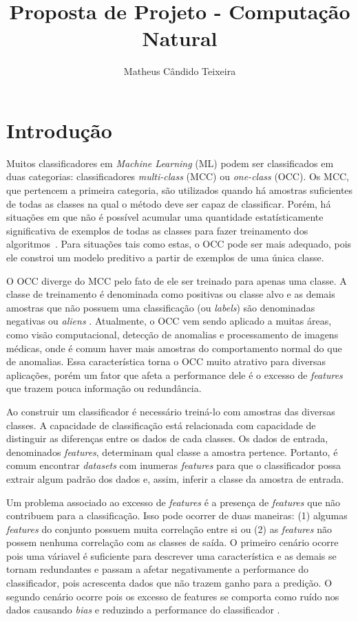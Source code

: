 \documentclass{article}
\begin{document}
\title{Proposta de Projeto - Computação Natural}
\author{Matheus Cândido Teixeira}
\maketitle

\section{Introdução}
Muitos classificadores em {\itshape Machine Learning} (ML) podem ser
classificados em duas categorias: classificadores \textit{multi-class} (MCC) ou
\textit{one-class} (OCC). Os MCC, que pertencem a primeira categoria, são
utilizados quando há amostras suficientes de todas as classes na qual o método
deve ser capaz de classificar. Porém, há situações em que não é possível
acumular uma quantidade estatísticamente significativa de exemplos de todas as
classes para fazer treinamento dos algoritmos~\cite{Khalifa2016, Khan2014}. Para
situações tais como estas, o OCC pode ser mais adequado, pois ele constroi um
modelo preditivo a partir de exemplos de uma única classe.

O OCC diverge do MCC pelo fato de ele ser treinado para apenas uma classe.  A
classe de treinamento é denominada como positivas ou classe alvo e as demais
amostras que não possuem uma classificação (ou \textit{labels}) são denominadas
negativas ou \textit{aliens} \cite{Khan2014, Perera2019}. Atualmente, o OCC vem
sendo aplicado a muitas áreas, como visão computacional, detecção de anomalias e
processamento de imagens médicas, onde é comum haver mais amostras do
comportamento normal do que de anomalias. Essa característica torna o OCC muito
atrativo para diversas aplicações, porém um fator que afeta a performance dele é
o excesso de \textit{features} que trazem pouca informação ou redundância.

Ao construir um classificador é necessário treiná-lo com amostras das diversas
classes. A capacidade de classificação está relacionada com capacidade de
distinguir as diferenças entre os dados de cada classes. Os dados de entrada,
denominados \textit{features}, determinam qual classe a amostra
pertence. Portanto, é comum encontrar \textit{datasets} com inumeras
\textit{features} para que o classificador possa extrair algum padrão dos dados
e, assim, inferir a classe da amostra de entrada.

Um problema associado ao excesso de \textit{features} é a presença de
\textit{features} que não contribuem para a classificação. Isso pode ocorrer de
duas maneiras: (1) algumas \textit{features} do conjunto possuem muita correlação
entre si ou (2) as \textit{features} não possem nenhuma correlação com as classes de
saída. O primeiro cenário ocorre pois uma váriavel é suficiente para descrever
uma característica e as demais se tornam redundantes e passam a afetar
negativamente a performance do classificador, pois acrescenta dados que não
trazem ganho para a predição. O segundo cenário ocorre pois os excesso de
features se comporta como ruído nos dados causando \textit{bias} e reduzindo a
performance do classificador \cite{Chandrashekar2014, Miao2016, Liu1998,
  Zheng2020}.
\end{document}
